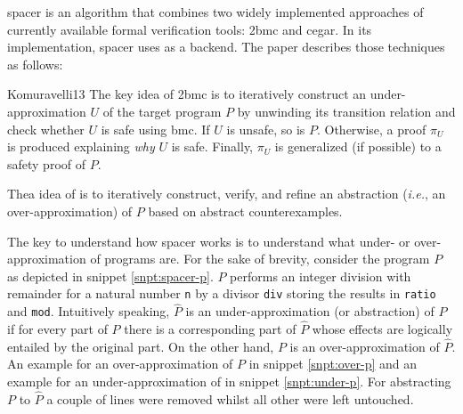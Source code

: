 \gls{spacer} \cite{Komuravelli13} is an algorithm that combines two widely implemented approaches of currently available formal verification tools: \gls{2bmc} and \gls{cegar}.
In its implementation, \gls{spacer} uses \muZ{} as a backend.
The paper describes those techniques as follows:
\begin{displaycquote}[p.1f]{Komuravelli13}
    The key idea of \gls{2bmc} is to iteratively construct an under-approximation  $ U $ of the target program $ P $ by unwinding its transition relation and check whether $ U $ is safe using \gls{bmc}.
    If $ U $ is unsafe, so is $ P $.
    Otherwise, a proof $ \pi_U $ is produced explaining \textit{why} $ U $ is safe.
    Finally, $ \pi_U $ is generalized (if possible) to a safety proof of $ P $.
    \textelp{}

    Thea idea of  is to iteratively construct, verify, and refine an abstraction (\textit{i.e.}, an over-approximation) of $ P $ based on abstract counterexamples.
\end{displaycquote}

The key to understand how \gls{spacer} works is to understand what under- or over-approximation of programs are.
For the sake of brevity, consider the program $ P $ as depicted in snippet \ref{snpt:spacer-p}.
$ P $ performs an integer division with remainder for a natural number \lstinline{n} by a divisor \lstinline{div} storing the results in \lstinline{ratio} and \lstinline{mod}.
Intuitively speaking, $ \hat{P} $ is an under-approximation (or abstraction) of $ P $ if for every part of $ P $ there is a corresponding part of $ \hat{P} $ whose effects are logically entailed by the original part.
On the other hand, $ P $ is an over-approximation of $ \hat{P} $.
An example for an over-approximation of $ P $ in snippet \ref{snpt:over-p} and an example for an under-approximation of in snippet \ref{snpt:under-p}.
For abstracting $ P $ to $ \hat{P} $ a couple of lines were removed whilst all other were left untouched.

